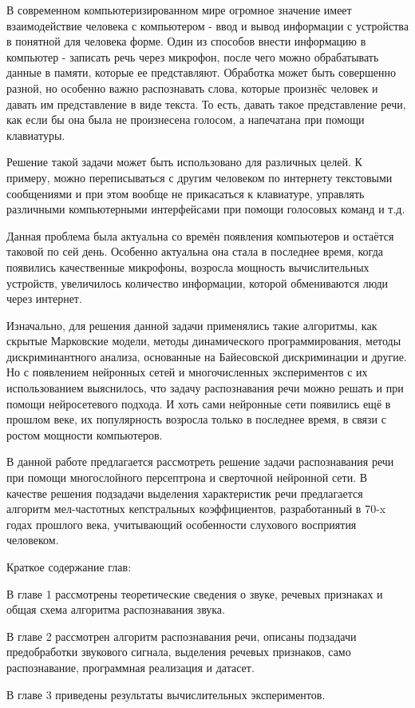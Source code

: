 В современном компьютеризированном мире огромное значение имеет взаимодействие человека с компьютером - ввод и вывод информации с устройства в понятной для человека форме. Один из способов внести информацию в компьютер - записать речь через микрофон, после чего можно обрабатывать данные в памяти, которые ее представляют. Обработка может быть совершенно разной, но особенно важно распознавать слова, которые произнёс человек и давать им представление в виде текста. То есть, давать такое представление речи, как если бы она была не произнесена голосом, а напечатана при помощи клавиатуры. 

Решение такой задачи может быть использовано для различных целей. К примеру, можно переписываться с другим человеком по интернету текстовыми сообщениями и при этом вообще не прикасаться к клавиатуре, управлять различными компьютерными интерфейсами при помощи голосовых команд и т.д.

Данная проблема была актуальна со времён появления компьютеров и остаётся таковой по сей день. Особенно актуальна она стала в последнее время, когда появились качественные микрофоны, возросла мощность вычислительных устройств, увеличилось количество информации, которой обмениваются люди через интернет.

Изначально, для решения данной задачи применялись такие алгоритмы, как скрытые Марковские модели, методы динамического программирования, методы дискриминантного анализа, основанные на Байесовской дискриминации и другие. Но с появлением нейронных сетей и многочисленных экспериментов с их использованием выяснилось, что задачу распознавания речи можно решать и при помощи нейросетевого подхода. И хоть сами нейронные сети появились ещё в прошлом веке, их популярность возросла только в последнее время, в связи с ростом мощности компьютеров.

В данной работе предлагается рассмотреть решение задачи распознавания речи при помощи многослойного персептрона и сверточной нейронной сети. В качестве решения подзадачи выделения характеристик речи предлагается алгоритм мел-частотных кепстральных коэффициентов, разработанный в 70-x годах прошлого века, учитывающий особенности слухового восприятия человеком.

Краткое содержание глав:

В главе 1 рассмотрены теоретические сведения о звуке, речевых признаках и общая схема алгоритма распознавания звука. 
 
В главе 2 рассмотрен алгоритм распознавания речи, описаны подзадачи предобработки звукового сигнала, выделения речевых признаков, само распознавание, программная реализация и датасет.

В главе 3 приведены результаты вычислительных экспериментов.